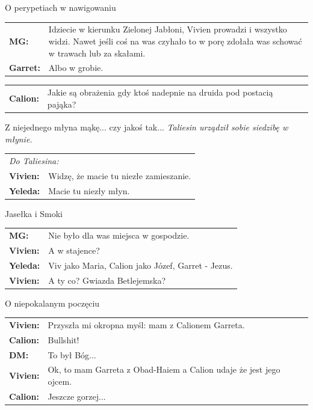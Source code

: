 \documentclass[10pt,twoside,twocolumn]{book}
\begin{document}
\begin{rpg-quotebox}{O perypetiach w nawigowaniu}
   \begin{tabularx}{\columnwidth}{lX}
      \textbf{MG:} & Idziecie w kierunku Zielonej Jabłoni, Vivien prowadzi i wszystko widzi. Nawet jeśli coś na was czyhało to w porę zdołała was schować w trawach lub za skałami.\\
      \textbf{Garret:} & Albo w grobie.\\
   \end{tabularx}
\end{rpg-quotebox}

\begin{rpg-quotebox}{}
   \begin{tabularx}{\columnwidth}{lX}
      \textbf{Calion:} & Jakie są obrażenia gdy ktoś nadepnie na druida pod postacią pająka?\\
   \end{tabularx}
\end{rpg-quotebox}

\begin{rpg-quotebox}{Z niejednego młyna mąkę... czy jakoś tak...}
   \textit{Taliesin urządził sobie siedzibę w młynie.}\\

   \begin{tabularx}{\columnwidth}{lX}
      \multicolumn{2}{l}{\textit{Do Taliesina:}}\\
      \textbf{Vivien:} & Widzę, że macie tu niezłe zamieszanie.\\
      \textbf{Yeleda:} & Macie tu niezły młyn.\\
   \end{tabularx}
\end{rpg-quotebox}

\begin{rpg-quotebox}{Jasełka i Smoki}
   \begin{tabularx}{\columnwidth}{lX}
      \textbf{MG:} & Nie było dla was miejsca w gospodzie.\\
      \textbf{Vivien:} & A w stajence?\\
      \textbf{Yeleda:} & Viv jako Maria, Calion jako Józef, Garret - Jezus.\\
      \textbf{Vivien:} & A ty co? Gwiazda Betlejemska?\\
   \end{tabularx}
\end{rpg-quotebox}

\begin{rpg-quotebox}{O niepokalanym poczęciu}
   \begin{tabularx}{\columnwidth}{lX}
\textbf{Vivien:} & Przyszła mi okropna myśl: mam z Calionem Garreta.\\
\textbf{Calion:} & Bullshit!\\
\textbf{DM:} & To był Bóg...\\
\textbf{Vivien:} & Ok, to mam Garreta z Obad-Haiem a Calion udaje że jest jego ojcem.\\
\textbf{Calion:} & Jeszcze gorzej...\\
   \end{tabularx}
\end{rpg-quotebox}
\end{document}
